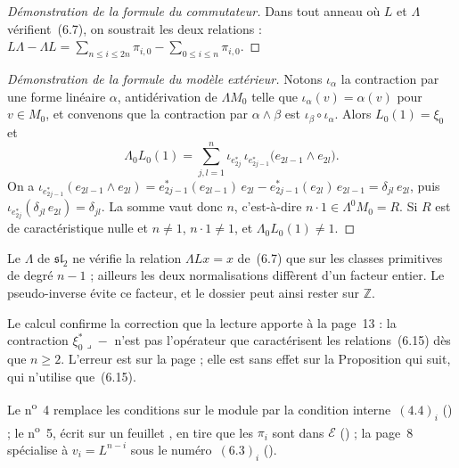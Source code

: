 \begin{proof}[Démonstration de la formule du commutateur]
Dans tout anneau où $L$ et $\Lambda$ vérifient~(6.7), on soustrait les deux relations : $L\Lambda - \Lambda L = \sum_{n \leqslant i \leqslant 2n} \pi_{i,0} - \sum_{0 \leqslant i \leqslant n} \pi_{i,0}$.
\end{proof}

\begin{proof}[Démonstration de la formule du modèle extérieur]
Notons $\iota_\alpha$ la contraction par une forme linéaire $\alpha$, antidérivation de $\Lambda M_0$ telle que $\iota_\alpha(v) = \alpha(v)$ pour $v \in M_0$, et convenons que la contraction par $\alpha \wedge \beta$ est $\iota_\beta \circ \iota_\alpha$. Alors $L_0(1) = \xi_0$ et
\[
\Lambda_0 L_0(1) = \sum_{j, l = 1}^{n} \iota_{e^*_{2j}}\, \iota_{e^*_{2j-1}} \bigl(e_{2l-1} \wedge e_{2l}\bigr).
\]
On a $\iota_{e^*_{2j-1}}(e_{2l-1} \wedge e_{2l}) = e^*_{2j-1}(e_{2l-1})\, e_{2l} - e^*_{2j-1}(e_{2l})\, e_{2l-1} = \delta_{jl}\, e_{2l}$, puis $\iota_{e^*_{2j}}(\delta_{jl}\, e_{2l}) = \delta_{jl}$. La somme vaut donc $n$, c'est-à-dire $n \cdot 1 \in \Lambda^0 M_0 = R$. Si $R$ est de caractéristique nulle et $n \neq 1$, $n \cdot 1 \neq 1$, et $\Lambda_0 L_0(1) \neq 1$.
\end{proof}

\begin{remarque}
Le $\Lambda$ de $\mathfrak{sl}_2$ ne vérifie la relation $\Lambda L x = x$ de~(6.7) que sur les classes primitives de degré $n - 1$ ; ailleurs les deux normalisations diffèrent d'un facteur entier. Le pseudo-inverse évite ce facteur, et le dossier peut ainsi rester sur $\mathbb Z$.
\end{remarque}

\begin{remarque}
Le calcul confirme la correction que la lecture apporte à la page~13 : la contraction $\xi_0^* \lrcorner -$ n'est pas l'opérateur que caractérisent les relations~(6.15) dès que $n \geqslant 2$. L'erreur est sur la page ; elle est sans effet sur la Proposition qui suit, qui n'utilise que~(6.15).
\end{remarque}

Le n\textsuperscript{o}~4 remplace les conditions sur le module par la condition interne~$(4.4)_i$ () ; le n\textsuperscript{o}~5, écrit sur un feuillet , en tire que les $\pi_i$ sont dans $\mathcal E$ () ; la page~8 spécialise à $v_i = L^{n-i}$ sous le numéro~$(6.3)_i$ ().

